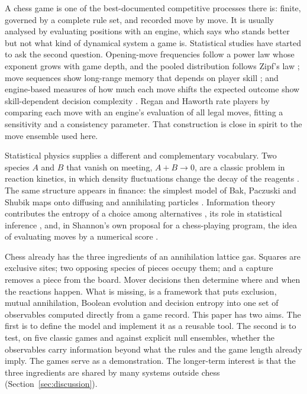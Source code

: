 \documentclass[11pt,a4paper]{article}
\begin{document}
A chess game is one of the best-documented competitive processes there is: finite, governed by a complete rule set, and recorded move by move. It is usually analysed by evaluating positions with an engine, which says who stands better but not what kind of dynamical system a game is. Statistical studies have started to ask the second question. Opening-move frequencies follow a power law whose exponent grows with game depth, and the pooled distribution follows Zipf's law \citep{blasius2009}; move sequences show long-range memory that depends on player skill \citep{schaigorodsky2013}; and engine-based measures of how much each move shifts the expected outcome show skill-dependent decision complexity \citep{chacoma2024}. Regan and Haworth \citep{regan2011} rate players by comparing each move with an engine's evaluation of all legal moves, fitting a sensitivity and a consistency parameter. That construction is close in spirit to the move ensemble used here.

Statistical physics supplies a different and complementary vocabulary. Two species $A$ and $B$ that vanish on meeting, $A+B\to 0$, are a classic problem in reaction kinetics, in which density fluctuations change the decay of the reagents \citep{ovchinnikov1978,toussaint1983}. The same structure appears in finance: the simplest model of Bak, Paczuski and Shubik maps onto diffusing and annihilating particles \citep{bak1997}. Information theory contributes the entropy of a choice among alternatives \citep{shannon1948}, its role in statistical inference \citep{jaynes1957}, and, in Shannon's own proposal for a chess-playing program, the idea of evaluating moves by a numerical score \citep{shannon1950}.

Chess already has the three ingredients of an annihilation lattice gas. Squares are exclusive sites; two opposing species of pieces occupy them; and a capture removes a piece from the board. Mover decisions then determine where and when the reactions happen. What is missing, is a framework that puts exclusion, mutual annihilation, Boolean evolution and decision entropy into one set of observables computed directly from a game record. 
This paper has two aims. The first is to define the model and implement it as a reusable tool. The second is to test, on five classic games and against explicit null ensembles, whether the observables carry information beyond what the rules and the game length already imply. The games serve as a demonstration. The longer-term interest is that the three ingredients are shared by many systems outside chess (Section~\ref{sec:discussion}).
\end{document}
